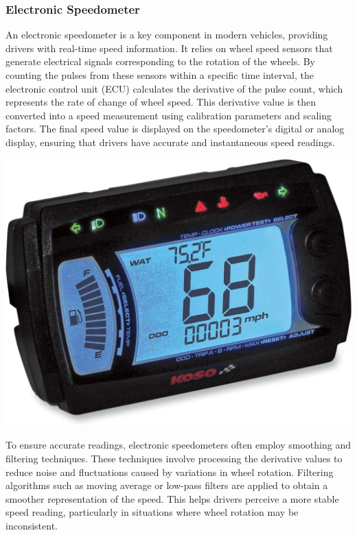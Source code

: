\documentclass[13pt,a4paper]{report}
\begin{document}

\subsubsection{Electronic Speedometer}

An electronic speedometer is a key component in modern vehicles, providing drivers with real-time speed information. It relies on wheel speed sensors that generate electrical signals corresponding to the rotation of the wheels. By counting the pulses from these sensors within a specific time interval, the electronic control unit (ECU) calculates the derivative of the pulse count, which represents the rate of change of wheel speed. This derivative value is then converted into a speed measurement using calibration parameters and scaling factors. The final speed value is displayed on the speedometer's digital or analog display, ensuring that drivers have accurate and instantaneous speed readings.\\[0.1cm]

\begin{center}
\includegraphics[width=.45\textwidth]{images/electronic_speedometer.jpg}
\end{center}

To ensure accurate readings, electronic speedometers often employ smoothing and filtering techniques. These techniques involve processing the derivative values to reduce noise and fluctuations caused by variations in wheel rotation. Filtering algorithms such as moving average or low-pass filters are applied to obtain a smoother representation of the speed. This helps drivers perceive a more stable speed reading, particularly in situations where wheel rotation may be inconsistent.
\end{document}
